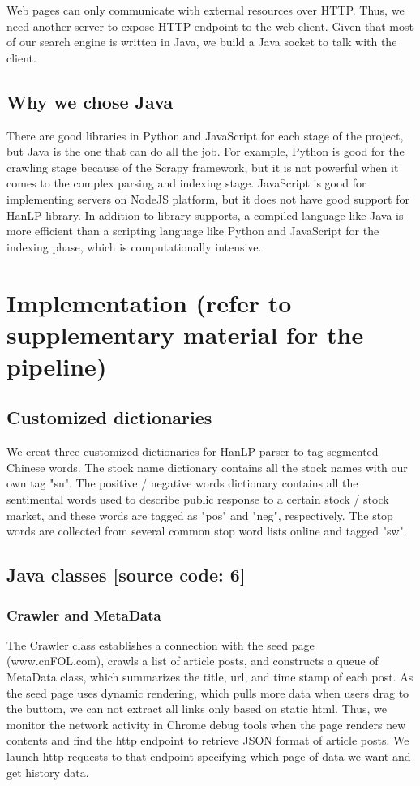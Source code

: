 \documentclass{article}
\begin{document}
Web pages can only communicate with external resources over HTTP. Thus, we need another server to expose HTTP endpoint to the web client. Given that most of our search engine is written in Java, we build a Java socket to talk with the client.

\subsection{Why we chose Java}
There are good libraries in Python and JavaScript for each stage of the project, but Java is the one that can do all the job. For example, Python is good for the crawling stage because of the Scrapy framework, but it is not powerful when it comes to the complex parsing and indexing stage. JavaScript is good for implementing servers on NodeJS platform, but it does not have good support for HanLP library. In addition to library supports, a compiled language like Java is more efficient than a scripting language like Python and JavaScript for the indexing phase, which is computationally intensive.

\section{Implementation (refer to supplementary material for the pipeline)}
\subsection{Customized dictionaries}
We creat three customized dictionaries for HanLP parser to tag segmented Chinese words. The stock name dictionary contains all the stock names with our own tag "sn". The positive / negative words dictionary contains all the sentimental words used to describe public response to a certain stock / stock market, and these words are tagged as "pos" and "neg", respectively. The stop words are collected from several common stop word lists online and tagged "sw".

\subsection{Java classes [source code: 6]}
\subsubsection{Crawler and MetaData}
The Crawler class establishes a connection with the seed page (www.cnFOL.com), crawls a list of article posts, and constructs a queue of MetaData class, which summarizes the title, url, and time stamp of each post. As the seed page uses dynamic rendering, which pulls more data when users drag to the buttom, we can not extract all links only based on static html. Thus, we monitor the network activity in Chrome debug tools when the page renders new contents and find the http endpoint to retrieve JSON format of article posts. We launch http requests to that endpoint specifying which page of data we want and get history data.
\end{document}
